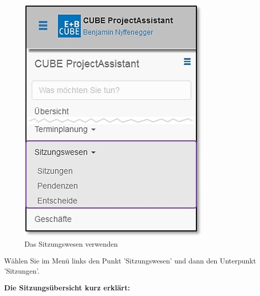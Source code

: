 \begin{figure}   %
  \vspace{-35pt}      %
  \begin{center}
    \includegraphics[width=1\linewidth]{../chapters/05_Sitzungswesen/pictures/5-1_Menu_Sitzungswesen.jpg}
  \end{center}
  \vspace{-20pt}
  \caption{Das Sitzungswesen verwenden}
  \vspace{-10pt}
\end{figure}

Wählen Sie im Menü links den Punkt 'Sitzungswesen' und dann den Unterpunkt 'Sitzungen'.

\vspace{5cm}

\pagebreak
\textbf{Die Sitzungsübersicht kurz erklärt:}

